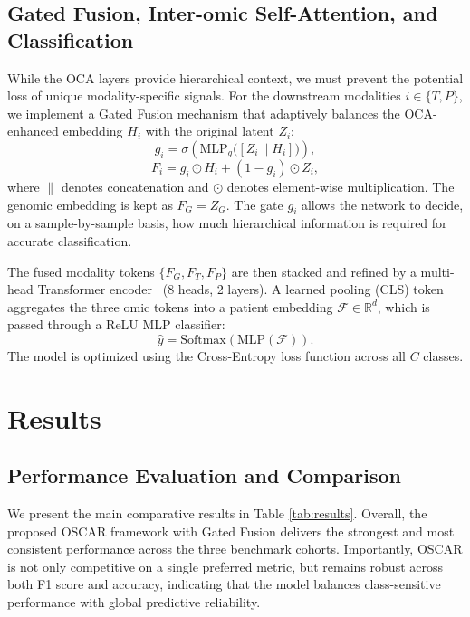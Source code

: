\documentclass[lettersize,journal]{IEEEtran}
\begin{document}
\subsection{Gated Fusion, Inter-omic Self-Attention, and Classification}
While the OCA layers provide hierarchical context, we must prevent the potential loss of unique modality-specific signals. For the downstream modalities $i \in \{T, P\}$, we implement a Gated Fusion mechanism that adaptively balances the OCA-enhanced embedding $H_i$ with the original latent $Z_i$:
\begin{equation}
    g_i = \sigma\!\left(\mathrm{MLP}_g\big([Z_i \parallel H_i]\big)\right),
\end{equation}
\begin{equation}
    F_i = g_i \odot H_i + (1 - g_i) \odot Z_i,
\end{equation}
where $\parallel$ denotes concatenation and $\odot$ denotes element-wise multiplication. The genomic embedding is kept as $F_G = Z_G$. The gate $g_i$ allows the network to decide, on a sample-by-sample basis, how much hierarchical information is required for accurate classification.

The fused modality tokens $\{F_G, F_T, F_P\}$ are then stacked and refined by a multi-head Transformer encoder~\cite{Vaswani2017Attention} (8 heads, 2 layers). A learned pooling (CLS) token aggregates the three omic tokens into a patient embedding $\mathcal{F} \in \mathbb{R}^{d}$, which is passed through a ReLU MLP classifier:
\begin{equation}
    \hat{y} = \text{Softmax}(\text{MLP}(\mathcal{F})).
\end{equation}
The model is optimized using the Cross-Entropy loss function across all $C$ classes.




\section{Results}
\subsection{Performance Evaluation and Comparison}

We present the main comparative results in Table \ref{tab:results}. Overall, the proposed OSCAR framework with Gated Fusion delivers the strongest and most consistent performance across the three benchmark cohorts. Importantly, OSCAR is not only competitive on a single preferred metric, but remains robust across both F1 score and accuracy, indicating that the model balances class-sensitive performance with global predictive reliability.
\end{document}
